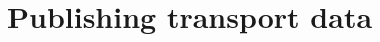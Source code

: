\documentclass{sig-alternate}
\begin{document}
\section{Publishing transport data}
\label{sec:publishing}







\end{document}

